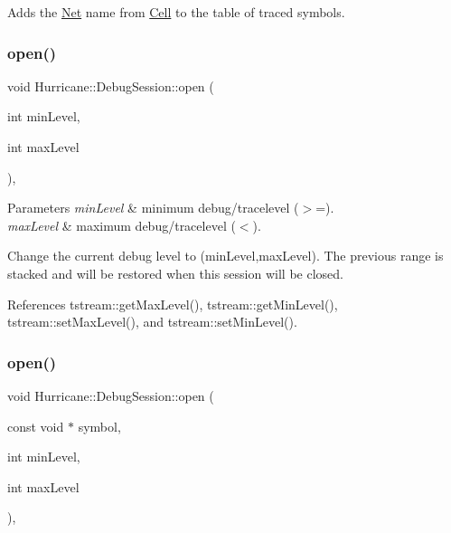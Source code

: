 Adds the \mbox{\hyperlink{classHurricane_1_1Net}{Net}} {\ttfamily name} from {\ttfamily \mbox{\hyperlink{classHurricane_1_1Cell}{Cell}}} to the table of traced symbols. \mbox{\label{classHurricane_1_1DebugSession_ac12865b68d1acfd85cd48d4d44d9c4fc}} 
\subsubsection{\texorpdfstring{open()}{open()}\hspace{0.1cm}{\footnotesize\ttfamily [1/2]}}
{\footnotesize\ttfamily void Hurricane\+::\+Debug\+Session\+::open (\begin{DoxyParamCaption}\item[{int}]{min\+Level,  }\item[{int}]{max\+Level }\end{DoxyParamCaption})\hspace{0.3cm}{\ttfamily [inline]}, {\ttfamily [static]}}


\begin{DoxyParams}{Parameters}
{\em min\+Level} & minimum debug/tracelevel ($>$=). \\
\hline
{\em max\+Level} & maximum debug/tracelevel ($<$).\\
\hline
\end{DoxyParams}
Change the current debug level to (min\+Level,max\+Level). The previous range is stacked and will be restored when this session will be closed. 

References tstream\+::get\+Max\+Level(), tstream\+::get\+Min\+Level(), tstream\+::set\+Max\+Level(), and tstream\+::set\+Min\+Level().

\mbox{\label{classHurricane_1_1DebugSession_a655f87fd8c8e20f287dea2a6d8fca556}} 
\subsubsection{\texorpdfstring{open()}{open()}\hspace{0.1cm}{\footnotesize\ttfamily [2/2]}}
{\footnotesize\ttfamily void Hurricane\+::\+Debug\+Session\+::open (\begin{DoxyParamCaption}\item[{const void $\ast$}]{symbol,  }\item[{int}]{min\+Level,  }\item[{int}]{max\+Level }\end{DoxyParamCaption})\hspace{0.3cm}{\ttfamily [inline]}, {\ttfamily [static]}}


